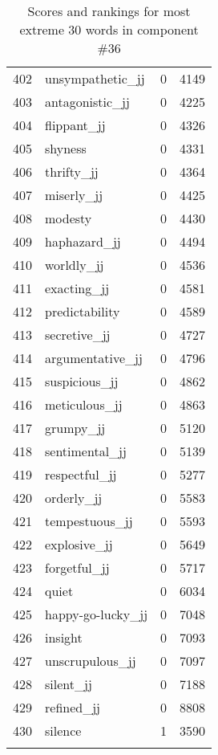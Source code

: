 \begin{longtable}[!htbp]{| rlr@{.}l |}
    402 & unsympathetic\_jj & 0 & 4149 \\
    403 & antagonistic\_jj & 0 & 4225 \\
    404 & flippant\_jj & 0 & 4326 \\
    405 & shyness & 0 & 4331 \\
    406 & thrifty\_jj & 0 & 4364 \\
    407 & miserly\_jj & 0 & 4425 \\
    408 & modesty & 0 & 4430 \\
    409 & haphazard\_jj & 0 & 4494 \\
    410 & worldly\_jj & 0 & 4536 \\
    411 & exacting\_jj & 0 & 4581 \\
    412 & predictability & 0 & 4589 \\
    413 & secretive\_jj & 0 & 4727 \\
    414 & argumentative\_jj & 0 & 4796 \\
    415 & suspicious\_jj & 0 & 4862 \\
    416 & meticulous\_jj & 0 & 4863 \\
    417 & grumpy\_jj & 0 & 5120 \\
    418 & sentimental\_jj & 0 & 5139 \\
    419 & respectful\_jj & 0 & 5277 \\
    420 & orderly\_jj & 0 & 5583 \\
    421 & tempestuous\_jj & 0 & 5593 \\
    422 & explosive\_jj & 0 & 5649 \\
    423 & forgetful\_jj & 0 & 5717 \\
    424 & quiet & 0 & 6034 \\
    425 & happy-go-lucky\_jj & 0 & 7048 \\
    426 & insight & 0 & 7093 \\
    427 & unscrupulous\_jj & 0 & 7097 \\
    428 & silent\_jj & 0 & 7188 \\
    429 & refined\_jj & 0 & 8808 \\
    430 & silence & 1 & 3590 \\
    \hline
    \caption{Scores and rankings for most extreme 30 words in component \#36} \\
\end{longtable}
